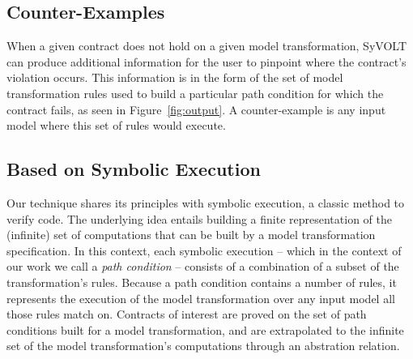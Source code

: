 \subsection{Counter-Examples}

When a given contract does not hold on a given model transformation,
SyVOLT can produce additional information for the user to pinpoint where
the contract's violation occurs. This information is in
the form of the set of model transformation rules used to build a particular
path condition for which the contract fails, as seen in Figure~\ref{fig:output}. A counter-example is any input model where this set of rules would execute.



\subsection{Based on Symbolic Execution}

Our technique shares its principles with symbolic execution, a classic method to
verify code. The underlying idea entails building a finite representation of the
(infinite) set of computations that can be built by a model transformation
specification. In this context, each symbolic execution -- which in the context
of our work we call a \emph{path condition} -- consists of a combination
of a subset of the transformation's rules.
Because a path condition contains a number of rules, it represents the execution
of the model transformation over any input model all those rules match on.
Contracts of interest are proved on the set of path conditions built for a
model transformation, and are extrapolated to the infinite set of
the model transformation's computations through an abstration relation.








